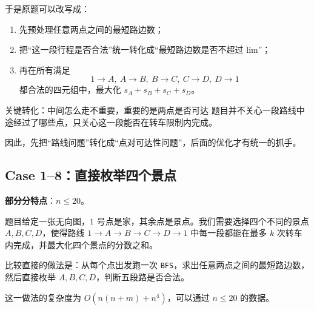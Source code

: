 \documentclass{book}
\newcommand{\code}[1]{\colorbox{codebg}{\texttt{#1}}}  %
\begin{document}
于是原题可以改写成：

\begin{enumerate}[leftmargin=2em,itemsep=1pt,topsep=2pt,parsep=0pt,partopsep=0pt]
    \item 先预处理任意两点之间的最短路边数；
    \item 把“这一段行程是否合法”统一转化成“最短路边数是否不超过 $\mathrm{lim}$”；
    \item 再在所有满足
    \[
    1\to A,\ A\to B,\ B\to C,\ C\to D,\ D\to 1
    \]
    都合法的四元组中，最大化 $s_A+s_B+s_C+s_D$。
\end{enumerate}

\begin{keybox}{关键转化：中间怎么走不重要，重要的是两点是否可达}
题目并不关心一段路线中途经过了哪些点，只关心这一段能否在转车限制内完成。

因此，先把“路线问题”转化成“点对可达性问题”，后面的优化才有统一的抓手。
\end{keybox}

\subsection{Case 1--8：直接枚举四个景点}

\textbf{部分分特点}：$n\le 20$。

题目给定一张无向图，$1$ 号点是家，其余点是景点。我们需要选择四个不同的景点 $A,B,C,D$，使得路线
$1\to A\to B\to C\to D\to 1$ 中每一段都能在最多 $k$ 次转车内完成，并最大化四个景点的分数之和。

比较直接的做法是：从每个点出发跑一次 \code{BFS}，求出任意两点之间的最短路边数，然后直接枚举 $A,B,C,D$，判断五段路是否合法。

这一做法的复杂度为 $O(n(n+m)+n^4)$，可以通过 $n\le 20$ 的数据。
\end{document}
